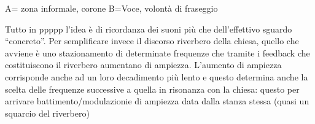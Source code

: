 A= zona informale, corone
B=Voce, volontà di fraseggio

Tutto in ppppp l'idea  è di ricordanza dei suoni più che dell'effettivo sguardo “concreto”.
Per semplificare invece il discorso riverbero della chiesa, quello che avviene è
uno stazionamento di determinate frequenze che tramite i feedback che costituiscono
il riverbero aumentano di ampiezza. L'aumento di ampiezza corrisponde anche ad un loro
decadimento più lento e questo determina anche la scelta delle frequenze successive a
quella in risonanza con la chiesa: questo per arrivare  battimento/modulazionie di
ampiezza data dalla stanza stessa (quasi un squarcio del riverbero)

%
%
%
